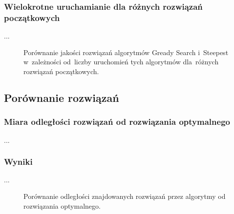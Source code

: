 \subsubsection{Wielokrotne uruchamianie dla różnych rozwiązań początkowych}

...

\begin{figure}
\begin{center}
\end{center}
\caption{Porównanie jakości rozwiązań algorytmów Gready Search i~Steepest w~zależności od~liczby uruchomień tych algorytmów dla~różnych rozwiązań początkowych.}
\label{fig:more}
\end{figure}

\subsection{Porównanie rozwiązań}

\subsubsection{Miara odległości rozwiązań od rozwiązania optymalnego}

...

\subsubsection{Wyniki}

...

\begin{figure}
\begin{center}
\end{center}
\caption{Porównanie odległości znajdowanych rozwiązań przez algorytmy od rozwiązania optymalnego.}
\label{fig:dist}
\end{figure}
